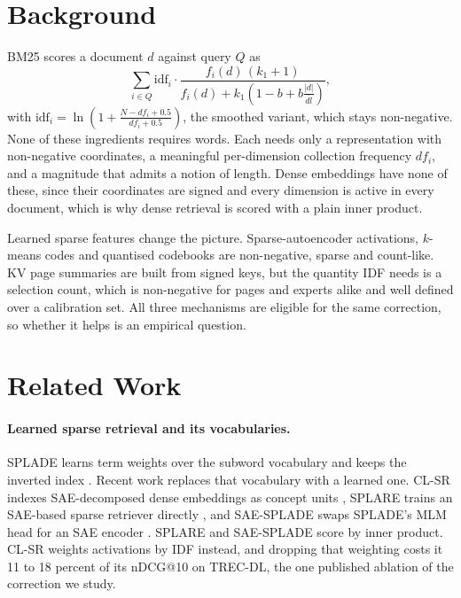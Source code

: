 \documentclass[11pt]{article}
\newcommand{\idf}{\mathrm{idf}}
\begin{document}
\section{Background}
\label{sec:background}

BM25 scores a document $d$ against query $Q$ as
\begin{equation}
\sum_{i \in Q} \idf_i \cdot
\frac{f_i(d)\,(k_1+1)}{f_i(d) + k_1\!\left(1 - b + b\frac{|d|}{\overline{dl}}\right)},
\label{eq:bm25}
\end{equation}
with $\idf_i = \ln\!\left(1 + \frac{N - df_i + 0.5}{df_i + 0.5}\right)$, the smoothed
variant, which stays non-negative. None of
these ingredients requires words. Each needs only a representation with
non-negative coordinates, a meaningful per-dimension collection frequency $df_i$,
and a magnitude that admits a notion of length. Dense embeddings have none of
these, since their coordinates are signed and every dimension is active in every
document, which is why dense retrieval is scored with a plain inner product.

Learned sparse features change the picture. Sparse-autoencoder activations,
$k$-means codes and quantised codebooks are non-negative, sparse and count-like.
KV page summaries are built from signed keys, but the quantity IDF needs is a
selection count, which is non-negative for pages and experts alike and well defined
over a calibration set. All three mechanisms are eligible for the same correction, so
whether it helps is an empirical question.

\section{Related Work}
\label{sec:related}

\paragraph{Learned sparse retrieval and its vocabularies.} SPLADE learns term weights
over the subword vocabulary and keeps the inverted index
\citep{formal2021splade,lassance2024spladev3}. Recent work replaces that vocabulary
with a learned one. CL-SR indexes SAE-decomposed dense embeddings
as concept units \citep{park2025clsr}, SPLARE trains an SAE-based sparse retriever
directly \citep{formal2026splare}, and SAE-SPLADE swaps SPLADE's MLM head for an
SAE encoder \citep{zong2026tokens}. SPLARE and SAE-SPLADE score by inner product. CL-SR
weights activations by IDF instead, and dropping that weighting costs it 11 to 18
percent of its nDCG@10 on TREC-DL, the one published ablation of the correction we
study.
\end{document}
